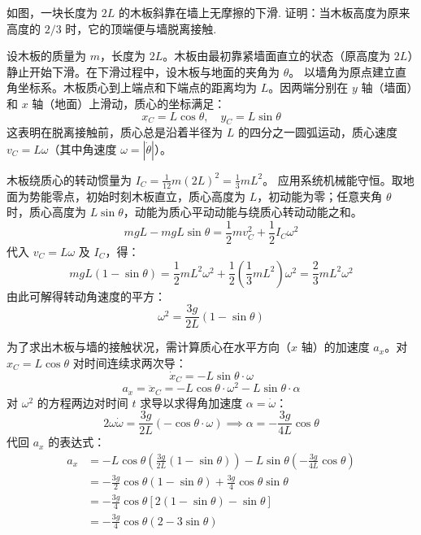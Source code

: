 \begin{exercise}\label{ex:6.5}
如图，一块长度为 $2L$ 的木板斜靠在墙上无摩擦的下滑. 证明：当木板高度为原来高度的 $2/3$ 时，它的顶端便与墙脱离接触.
\begin{center}
\end{center}
\end{exercise}
\begin{solution}
设木板的质量为 $m$，长度为 $2L$。木板由最初靠紧墙面直立的状态（原高度为 $2L$）静止开始下滑。在下滑过程中，设木板与地面的夹角为 $\theta$。
以墙角为原点建立直角坐标系。木板质心到上端点和下端点的距离均为 $L$。因两端分别在 $y$ 轴（墙面）和 $x$ 轴（地面）上滑动，质心的坐标满足：
$$ x_C = L \cos\theta, \quad y_C = L \sin\theta $$
这表明在脱离接触前，质心总是沿着半径为 $L$ 的四分之一圆弧运动，质心速度 $v_C = L \omega$（其中角速度 $\omega = |\dot{\theta}|$）。

木板绕质心的转动惯量为 $I_C = \frac{1}{12} m (2L)^2 = \frac{1}{3} m L^2$。
应用系统机械能守恒。取地面为势能零点，初始时刻木板直立，质心高度为 $L$，初动能为零；任意夹角 $\theta$ 时，质心高度为 $L \sin\theta$，动能为质心平动动能与绕质心转动动能之和。
$$ m g L - m g L \sin\theta = \frac{1}{2} m v_C^2 + \frac{1}{2} I_C \omega^2 $$
代入 $v_C = L \omega$ 及 $I_C$，得：
$$ m g L (1 - \sin\theta) = \frac{1}{2} m L^2 \omega^2 + \frac{1}{2} \left( \frac{1}{3} m L^2 \right) \omega^2 = \frac{2}{3} m L^2 \omega^2 $$
由此可解得转动角速度的平方：
$$ \omega^2 = \frac{3g}{2L} (1 - \sin\theta) $$

为了求出木板与墙的接触状况，需计算质心在水平方向（$x$ 轴）的加速度 $a_x$。对 $x_C = L \cos\theta$ 对时间连续求两次导：
$$ \dot{x}_C = -L \sin\theta \cdot \omega $$
$$ a_x = \ddot{x}_C = -L \cos\theta \cdot \omega^2 - L \sin\theta \cdot \alpha $$
对 $\omega^2$ 的方程两边对时间 $t$ 求导以求得角加速度 $\alpha = \dot{\omega}$：
$$ 2 \omega \dot{\omega} = \frac{3g}{2L} (-\cos\theta \cdot \omega) \implies \alpha = -\frac{3g}{4L} \cos\theta $$
代回 $a_x$ 的表达式：
\begin{align*}
    a_x &= -L \cos\theta \left( \frac{3g}{2L} (1 - \sin\theta) \right) - L \sin\theta \left( -\frac{3g}{4L} \cos\theta \right) \\
        &= -\frac{3g}{2} \cos\theta (1 - \sin\theta) + \frac{3g}{4} \cos\theta \sin\theta \\
        &= -\frac{3g}{4} \cos\theta \left[ 2(1 - \sin\theta) - \sin\theta \right] \\
        &= -\frac{3g}{4} \cos\theta (2 - 3\sin\theta)
\end{align*}


\end{solution}
